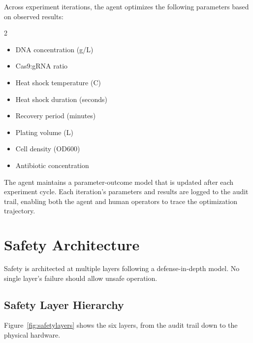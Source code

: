 \documentclass[11pt,letterpaper]{article}
\begin{document}
Across experiment iterations, the agent optimizes the following parameters based on observed results:

\begin{multicols}{2}
\begin{itemize}
  \item DNA concentration (\textmu{}g/\textmu{}L)
  \item Cas9:gRNA ratio
  \item Heat shock temperature (\textdegree{}C)
  \item Heat shock duration (seconds)
  \item Recovery period (minutes)
  \item Plating volume (\textmu{}L)
  \item Cell density (OD600)
  \item Antibiotic concentration
\end{itemize}
\end{multicols}

The agent maintains a parameter-outcome model that is updated after each experiment cycle. Each iteration's parameters and results are logged to the audit trail, enabling both the agent and human operators to trace the optimization trajectory.


\section{Safety Architecture}

Safety is architected at multiple layers following a defense-in-depth model. No single layer's failure should allow unsafe operation.

\subsection{Safety Layer Hierarchy}

Figure~\ref{fig:safetylayers} shows the six layers, from the audit trail down to the physical hardware.
\end{document}
